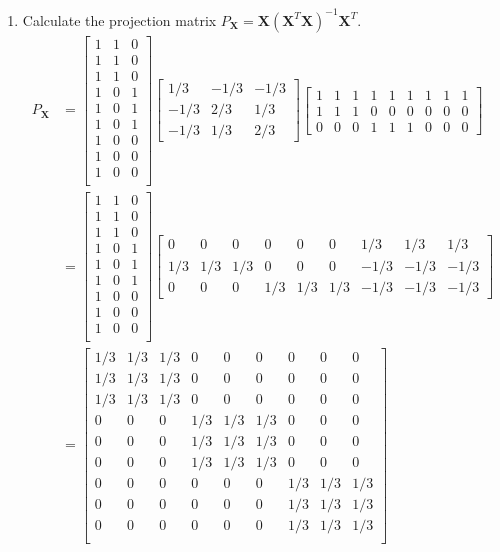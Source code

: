 \documentclass{article}
\begin{document}
\begin{enumerate}[leftmargin = 0 em, label = \arabic*., font = \bfseries]
\begin{enumerate}
		\item  Calculate the projection matrix $P_{\bm X} = \bm X (\bm X^T \bm X)^{-1} \bm X^T$.
		\begin{align*}
		P_{\bm X} &= 
		\begin{bmatrix}
			1&1&0\\
			1&1&0\\
			1&1&0\\
			1&0&1\\
			1&0&1\\
			1&0&1\\
			1&0&0\\
			1&0&0\\
			1&0&0\\
		\end{bmatrix}
		\begin{bmatrix}
			1/3 & -1/3 & -1/3\\
			-1/3 & 2/3 & 1/3\\
			-1/3 & 1/3 & 2/3
		\end{bmatrix}
		\begin{bmatrix}
			1&1&1&1&1&1&1&1&1\\
			1&1&1&0&0&0&0&0&0\\
			0&0&0&1&1&1&0&0&0
		\end{bmatrix} 
		\\
		& = \begin{bmatrix}
			1&1&0\\
			1&1&0\\
			1&1&0\\
			1&0&1\\
			1&0&1\\
			1&0&1\\
			1&0&0\\
			1&0&0\\
			1&0&0\\
		\end{bmatrix}
		\begin{bmatrix}
			0 & 0 & 0 &0&0&0&1/3&1/3&1/3\\
			1/3 & 1/3 & 1/3 & 0 & 0 & 0 & -1/3 & -1/3 & -1/3\\
			0 &0 &0 &1/3&1/3&1/3&-1/3 &-1/3 &-1/3
		\end{bmatrix}
		\\
		&=\begin{bmatrix}
			1/3 &1/3 &1/3&0&0&0&0&0&0\\
			1/3 &1/3 &1/3&0&0&0&0&0&0\\
			1/3 &1/3 &1/3&0&0&0&0&0&0\\
			0&0&0&1/3 &1/3 &1/3 &0&0&0\\
			0&0&0&1/3 &1/3 &1/3 &0&0&0\\
			0&0&0&1/3 &1/3 &1/3 &0&0&0\\
			0&0&0&0&0&0&1/3 &1/3 &1/3\\
			0&0&0&0&0&0&1/3 &1/3 &1/3\\
			0&0&0&0&0&0&1/3 &1/3 &1/3\\
		\end{bmatrix}
		\end{align*}
	\end{enumerate}
	

\end{enumerate}
\end{document}
